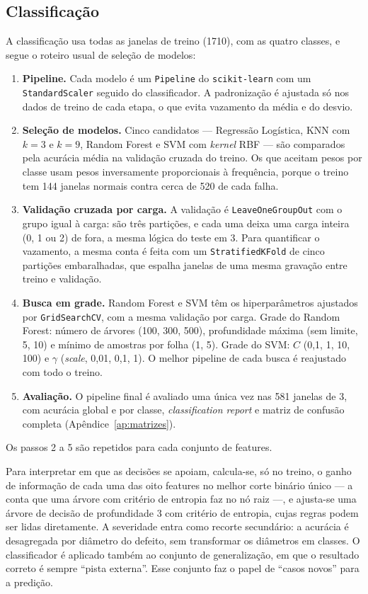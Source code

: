 \subsection{Classificação}
\label{sec:met-classificacao}

A classificação usa todas as janelas de treino (\num{1710}), com as quatro
classes, e segue o roteiro usual de seleção de modelos:
\begin{enumerate}
  \item \textbf{Pipeline.} Cada modelo é um \texttt{Pipeline} do
  \texttt{scikit-learn} com um \texttt{StandardScaler} seguido do classificador.
  A padronização é ajustada só nos dados de treino de cada etapa, o que evita
  vazamento da média e do desvio.
  \item \textbf{Seleção de modelos.} Cinco candidatos --- Regressão Logística,
  KNN com $k = 3$ e $k = 9$, Random Forest e SVM com \emph{kernel} RBF --- são
  comparados pela acurácia média na validação cruzada do treino. Os que aceitam
  pesos por classe usam pesos inversamente proporcionais à frequência, porque o
  treino tem 144 janelas normais contra cerca de 520 de cada falha.
  \item \textbf{Validação cruzada por carga.} A validação é
  \texttt{LeaveOneGroupOut} com o grupo igual à carga: são três partições, e cada
  uma deixa uma carga inteira (0, 1 ou \SI{2}{\hp}) de fora, a mesma lógica do
  teste em \SI{3}{\hp}. Para quantificar o vazamento, a mesma
  conta é feita com um \texttt{StratifiedKFold} de cinco partições embaralhadas,
  que espalha janelas de uma mesma gravação entre treino e validação.
  \item \textbf{Busca em grade.} Random Forest e SVM têm os hiperparâmetros
  ajustados por \texttt{GridSearchCV}, com a mesma validação por carga. Grade do
  Random Forest: número de árvores (100, 300, 500), profundidade máxima (sem
  limite, 5, 10) e mínimo de amostras por folha (1, 5). Grade do SVM: $C$ (0,1,
  1, 10, 100) e $\gamma$ (\emph{scale}, 0,01, 0,1, 1). O melhor pipeline de cada
  busca é reajustado com todo o treino.
  \item \textbf{Avaliação.} O pipeline final é avaliado uma única vez nas 581
  janelas de \SI{3}{\hp}, com acurácia global e por classe,
  \emph{classification report} e matriz de confusão completa
  (Apêndice~\ref{ap:matrizes}).
\end{enumerate}
Os passos 2 a 5 são repetidos para cada conjunto de features.

Para interpretar em que as decisões se apoiam, calcula-se, só no treino, o ganho
de informação de cada uma das oito features no melhor corte binário único --- a
conta que uma árvore com critério de entropia faz no nó raiz ---, e ajusta-se uma
árvore de decisão de profundidade 3 com critério de entropia, cujas regras podem
ser lidas diretamente. A severidade entra como recorte secundário: a
acurácia é desagregada por diâmetro do defeito, sem transformar os diâmetros em
classes. O classificador é aplicado também ao conjunto de generalização, em que
o resultado correto é sempre ``pista externa''. Esse conjunto faz o papel de
``casos novos'' para a predição.

